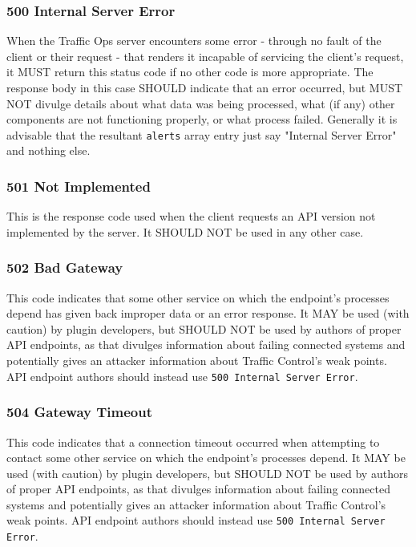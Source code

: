 \documentclass{article}
\newcommand{\code}[1]{\texttt{\color{inlinecodecolor}#1}}
\begin{document}
\subsubsection{500 Internal Server Error}
When the Traffic Ops server encounters some error - through no fault of the client or their request - that renders it incapable of servicing the client's
request, it MUST return this status code if no other code is more appropriate. The response body in this case SHOULD indicate that an error occurred, but
MUST NOT divulge details about what data was being processed, what (if any) other components are not functioning properly, or what process failed. Generally
it is advisable that the resultant \code{alerts} array entry just say "Internal Server Error" and nothing else.

\subsubsection{501 Not Implemented}
This is the response code used when the client requests an API version not implemented by the server. It SHOULD NOT be used in any other case.

\subsubsection{502 Bad Gateway}
This code indicates that some other service on which the endpoint's processes depend has given back improper data or an error response. It MAY be used
(with caution) by plugin developers, but SHOULD NOT be used by authors of proper API endpoints, as that divulges information about failing connected systems
and potentially gives an attacker information about Traffic Control's weak points. API endpoint authors should instead use \code{500 Internal Server Error}.

\subsubsection{504 Gateway Timeout}
This code indicates that a connection timeout occurred when attempting to contact some other service on which the endpoint's processes depend. It MAY be used
(with caution) by plugin developers, but SHOULD NOT be used by authors of proper API endpoints, as that divulges information about failing connected systems
and potentially gives an attacker information about Traffic Control's weak points. API endpoint authors should instead use \code{500 Internal Server Error}.
\end{document}
